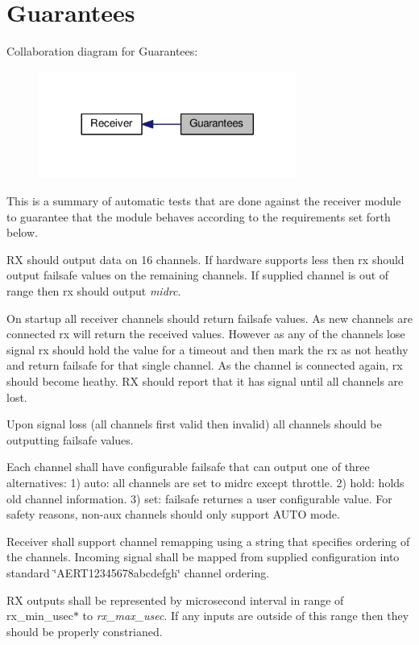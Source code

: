 \hypertarget{group__RXSPEC}{\section{Guarantees}
\label{group__RXSPEC}
}
Collaboration diagram for Guarantees\+:\nopagebreak
\begin{figure}[H]
\begin{center}
\leavevmode
\includegraphics[width=240pt]{group__RXSPEC}
\end{center}
\end{figure}
This is a summary of automatic tests that are done against the receiver module to guarantee that the module behaves according to the requirements set forth below.


\begin{DoxyItemize}
\item R\+X should output data on 16 channels. If hardware supports less then rx should output failsafe values on the remaining channels. If supplied channel is out of range then rx should output {\itshape midrc}.
\item On startup all receiver channels should return failsafe values. As new channels are connected rx will return the received values. However as any of the channels lose signal rx should hold the value for a timeout and then mark the rx as not heathy and return failsafe for that single channel. As the channel is connected again, rx should become heathy. R\+X should report that it has signal until all channels are lost.
\item Upon signal loss (all channels first valid then invalid) all channels should be outputting failsafe values.
\item Each channel shall have configurable failsafe that can output one of three alternatives\+: 1) auto\+: all channels are set to midrc except throttle. 2) hold\+: holds old channel information. 3) set\+: failsafe returnes a user configurable value. For safety reasons, non-\/aux channels should only support A\+U\+T\+O mode.
\item Receiver shall support channel remapping using a string that specifies ordering of the channels. Incoming signal shall be mapped from supplied configuration into standard \char`\"{}\+A\+E\+R\+T12345678abcdefgh\char`\"{} channel ordering.
\item R\+X outputs shall be represented by microsecond interval in range of rx\+\_\+min\+\_\+usec$\ast$ to {\itshape rx\+\_\+max\+\_\+usec}. If any inputs are outside of this range then they should be properly constrianed. 
\end{DoxyItemize}